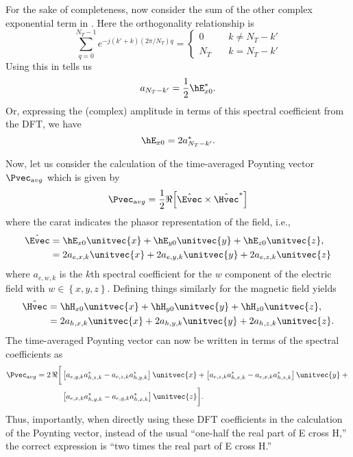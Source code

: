 For the sake of completeness, now consider the sum of the other
complex exponential term in .  Here the
orthogonality relationship is
\begin{equation}
  \sum_{q=0}^{N_T-1} e^{-j(k' + k)(2\pi/N_T) q} 
  =
\left\{
  \begin{array}{cl}
     0    &  \quad k\neq N_T - k' \\
     N_T  &  \quad k = N_T - k' 
  \end{array}
\right.
\end{equation}
Using this in  tells us
\begin{equation}
  a_{N_T - k'} = \frac{1}{2} \hE_{x0}^*.
\end{equation}
Or, expressing the (complex) amplitude in terms of this spectral
coefficient from the DFT, we have
\begin{equation}
  \hE_{x0} = 2 a_{N_T - k'}^*.
\end{equation}

Now, let us consider the calculation of the time-averaged Poynting
vector $\Pvec_{\mathrm avg}$ which is given by
\begin{equation}
  \Pvec_{\mathrm avg} = 
  \frac{1}{2}\Re\!\left[\hat{\Evec} \times \hat{\Hvec}^* \right]
\end{equation}
where the carat indicates the phasor representation of the field,
i.e.,
\begin{align}
\hat{\Evec} &=
  \hE_{x0} \unitvec{x} +
  \hE_{y0} \unitvec{y} +
  \hE_{z0} \unitvec{z}, \nonumber \\
  &= 2 a_{e,x,k} \unitvec{x} +
     2 a_{e,y,k} \unitvec{y} +
     2 a_{e,z,k} \unitvec{z}
\end{align}
where $a_{e,w,k}$ is the $k$th spectral coefficient for the $w$
component of the electric field with $w\in \left\{x,y,z\right\}$.
Defining things similarly for the magnetic field yields
\begin{align}
\hat{\Hvec} &=
  \hH_{x0} \unitvec{x} +
  \hH_{y0} \unitvec{y} +
  \hH_{z0} \unitvec{z}, \nonumber \\
  &= 2 a_{h,x,k} \unitvec{x} +
     2 a_{h,y,k} \unitvec{y} +
     2 a_{h,z,k} \unitvec{z}.
\end{align}
The time-averaged Poynting vector can now be written in terms of the
spectral coefficients as
\begin{align}
  \Pvec_{\mathrm avg} = 
  2 \, \Re\biggl[
  &\left[a_{e,y,k}a_{h,z,k}^* - a_{e,z,k}a_{h,y,k}^*\right] \unitvec{x} +
  \left[a_{e,z,k}a_{h,x,k}^* - a_{e,x,k}a_{h,z,k}^*\right] \unitvec{y}
  + \mbox{}
  \nonumber \\
  &\left[a_{e,x,k}a_{h,y,k}^* - a_{e,y,k}a_{h,x,k}^*\right] \unitvec{z}
  \biggr].
\end{align}
Thus, importantly, when directly using these DFT coefficients in the
calculation of the Poynting vector, instead of the usual ``one-half
the real part of E cross H,'' the correct expression is ``two times
the real part of E cross H.''

